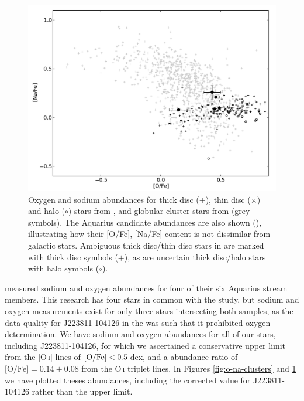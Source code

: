 \documentclass{emulateapj}
\begin{document}
\begin{figure}[t!]
	\includegraphics[width=\textwidth]{./figures/aquarius-o-na-halo.pdf}
	\caption{Oxygen and sodium abundances for thick disc ($+$), thin disc ($\times$) and halo ($\circ$) stars from \citet{reddy;et-al_2006}, and globular cluster stars from \citet{carretta;et-al_2009a} (grey symbols). The Aquarius candidate abundances are also shown (\textbullet), illustrating how their [O/Fe], [Na/Fe] content is not dissimilar from galactic stars. Ambiguous thick disc/thin disc stars in \citet{reddy;et-al_2006} are marked with thick disc symbols ($+$), as are uncertain thick disc/halo stars with halo symbols ($\circ$).}
	\label{fig:o-na}
\end{figure}

\citet{wylie-de-boer;et-al_2012} measured sodium and oxygen abundances for four of their six Aquarius stream members. This research has four stars in common with the \citet{wylie-de-boer;et-al_2012} study, but sodium and oxygen measurements exist for only three stars intersecting both samples, as the data quality for {J223811-104126} in the \citet{wylie-de-boer;et-al_2012} was such that it prohibited oxygen determination. We have sodium and oxygen abundances for all of our stars, including {J223811-104126}, for which we ascertained a conservative upper limit from the {[O\,\textsc{i}]} lines of {${\rm [O/Fe]} < 0.5$\,dex}, and a abundance ratio of {$\mbox{[O/Fe]} = 0.14 \pm 0.08$} from the {O\,\textsc{i}} triplet lines. In Figures \ref{fig:o-na-clusters} and \ref{fig:o-na} we have plotted theses abundances, including the corrected value for {J223811-104126} rather than the upper limit.
\end{document}
